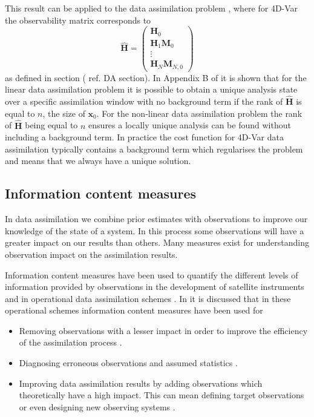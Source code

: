 \documentclass[11pt]{article}
\begin{document}
This result can be applied to the data assimilation problem \citep{johnson2005singular}, where for 4D-Var the observability matrix corresponds to
\begin{equation}
\hat{\mathbf{H}}=
\begin{pmatrix}
\mathbf{H}_0 \\
\mathbf{H}_1\mathbf{M}_0\\
\vdots \\
\mathbf{H}_N\mathbf{M}_{N,0}
\end{pmatrix} \label{eqn: hmat}
\end{equation}
as defined in section ({\color{red} ref. DA section}). In Appendix B of \citet{zou1992incomplete} it is shown that for the linear data assimilation problem it is possible to obtain a unique analysis state over a specific assimilation window with no background term if the rank of $\hat{\textbf{H}}$ is equal to $n$, the size of $\textbf{x}_0$. For the non-linear data assimilation problem the rank of $\hat{\textbf{H}}$ being equal to $n$ ensures a locally unique analysis can be found without including a background term. In practice the cost function for 4D-Var data assimilation typically contains a background term which regularises the problem and means that we always have a unique solution.

\subsection{Information content measures} \label{sec:IC}%

In data assimilation we combine prior estimates with observations to improve our knowledge of the state of a system. In this process some observations will have a greater impact on our results than others. Many measures exist for understanding observation impact on the assimilation results.

Information content measures have been used to quantify the different levels of information provided by observations in the development of satellite instruments \citep{stewart2008correlated, engelen2004information} and in operational data assimilation schemes \citep{fisher2003estimation, singh2013practical}. In \citet{Fowler2013} it is discussed that in these operational schemes information content measures have been used for
\begin{itemize}
\item Removing observations with a lesser impact in order to improve the efficiency of the assimilation process \citep{rabier2002channel, singh2013practical, rodgers1998information}.
\item Diagnosing erroneous observations and assumed statistics \citep{desroziers2009posteriori}.
\item Improving data assimilation results by adding observations which theoretically have a high impact. This can mean defining target observations \citep{palmer1998singular} or even designing new observing systems \citep{wahba1985design, eyre1990information}. 
\end{itemize}
\end{document}
